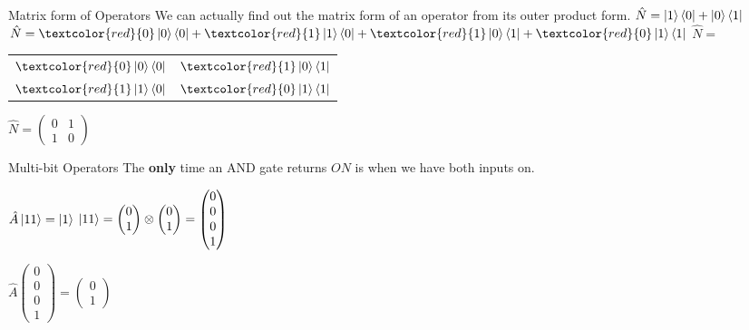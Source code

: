 \documentclass{beamer}
\begin{document}
\begin{frame}{Matrix form of Operators}
    We can actually find out the matrix form of an operator from its outer product form.\vfill
    \centering
    \begin{math}
        \hat{N} = \ket{1}\bra{0} + \ket{0}\bra{1}
    \end{math}\vfill
    \pause
    \begin{math}
        \hat{N} = \textcolor{red}{0}\ket{0}\bra{0} + \textcolor{red}{1}\ket{1}\bra{0} + \textcolor{red}{1}\ket{0}\bra{1} + \textcolor{red}{0}\ket{1}\bra{1}
    \end{math}
    \vfill
    \pause
    $\hat{N} = $\begin{tabular}{c c}
            $\textcolor{red}{0}\ket{0}\bra{0}$ & $\textcolor{red}{1}\ket{0}\bra{1}$\\
            $\textcolor{red}{1}\ket{1}\bra{0}$ & $\textcolor{red}{0}\ket{1}\bra{1}$
    \end{tabular}
    \vfill
    \pause
    \begin{math}
        \hat{N} = 
        \begin{pmatrix}
            0 & 1 \\ 1 & 0
        \end{pmatrix}
    \end{math}
\end{frame}

\begin{frame}{Multi-bit Operators}
    The \textbf{only} time an AND gate returns $ON$ is when we have both inputs on.\vfill

    \begin{center}
    \begin{math}
        \hat{A}\ket{11} = \ket{1}
    \end{math}\vfill
    \begin{math}
        \centering
        \ket{11}=
        \begin{pmatrix} 0 \\ 1 \end{pmatrix} 
        \otimes 
        \begin{pmatrix} 0 \\ 1 \end{pmatrix} 
        =
        \begin{pmatrix} 0 \\ 0 \\ 0 \\ 1 \end{pmatrix} 
    \end{math}

    \begin{math}
        \hat{A}\begin{pmatrix} 0 \\ 0 \\ 0 \\ 1 \end{pmatrix} = \begin{pmatrix} 0 \\ 1 \end{pmatrix} 
    \end{math}
    \end{center}
\end{frame}
\end{document}
